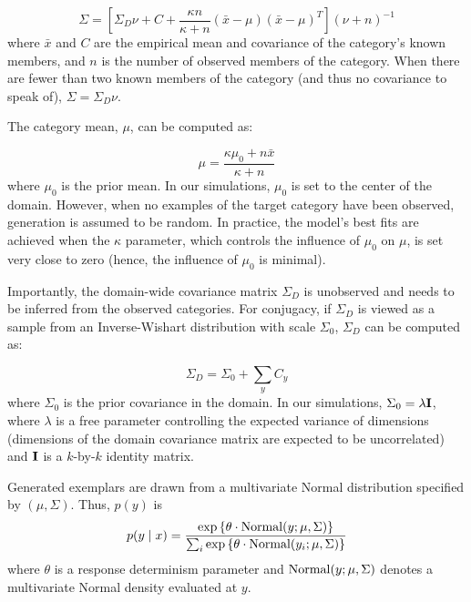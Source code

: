 \documentclass[12pt]{article}
\begin{document}
\begin{equation}
\Sigma = \left[ \Sigma_D \nu + C +
\dfrac
{\kappa n}
{\kappa + n}
(\bar{x}-\mu)(\bar{x}-\mu)^T
\right] (\nu + n)^{-1}
\label{eq:Sigma_B}
\end{equation}
% 
where $\bar{x}$ and $C$ are the empirical mean and covariance of the category's known members, and $n$ is the number of observed members of the category. When there are fewer than two known members of the category (and thus no covariance to speak of), $\Sigma = \Sigma_D\nu$.

The category mean, $\mu$, can be computed as:

\begin{equation}
  \mu = \dfrac
    {\kappa\mu_{0} + n \bar{x}}
    {\kappa + n}
    \label{eq:category_mus}
\end{equation}
% 
where $\mu_{0}$ is the prior mean. In our simulations, $\mu_{0}$ is set to the center of the domain. However, when no examples of the target category have been observed, generation is assumed to be random. In practice, the model's best fits are achieved when the  $\kappa$ parameter, which controls the influence of $\mu_0$ on $\mu$, is set very close to zero (hence, the influence of $\mu_0$ is minimal).

Importantly, the domain-wide covariance matrix $\Sigma_D$ is unobserved and needs to be inferred from the observed categories. For conjugacy, if $\Sigma_D$ is viewed as a sample from an Inverse-Wishart distribution with scale $\Sigma_0$, $\Sigma_D$ can be computed as:

 \begin{equation}
    \Sigma_D = \Sigma_0 + \sum_y{C_y}
    \label{eq:category_mus}
\end{equation}
% 
where $\Sigma_0$ is the prior covariance in the domain. In our simulations, $\Sigma_0 = \lambda {\bf I}$, where $\lambda$ is a free parameter controlling the expected variance of dimensions (dimensions of the domain covariance matrix are expected to be uncorrelated) and ${\bf I}$ is a $k$-by-$k$ identity matrix. 

Generated exemplars are drawn from a multivariate Normal distribution specified by $(\mu, \Sigma)$. Thus, $p(y)$ is
\begin{equation}
p(y \mid x) = \dfrac
{\exp \left \{ \theta \cdot {\rm Normal}(y; \mu, \Sigma) \right \} }
{\sum_i \exp \left \{ \theta \cdot {\rm Normal}(y_i; \mu, \Sigma) \right \} } 
\end{equation}
% 
where $\theta$ is a response determinism parameter and ${\rm Normal}(y; \mu, \Sigma)$ denotes a multivariate Normal density evaluated at $y$. 
\end{document}
